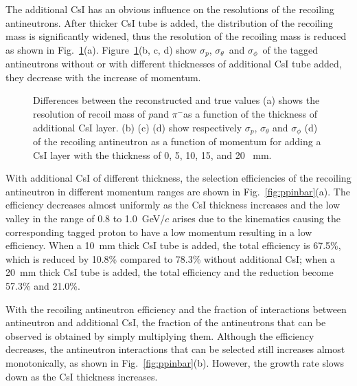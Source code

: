\documentclass[aps,preprint,showkeys,superscriptaddress]{revtex4}
\newcommand{\pp}{$p$}
\newcommand{\pim}{$\pi^-$}
\newcommand{\pres}{$\sigma_p$}
\newcommand{\tres}{$\sigma_\theta$}
\newcommand{\phires}{$\sigma_\phi$}
\begin{document}
The additional CsI has an obvious influence on the resolutions of the recoiling
antineutrons. After thicker CsI tube is added, the distribution of the
recoiling mass is significantly widened, thus the resolution of the recoiling
mass is reduced as shown in Fig.~\ref{fig:nbar_resolutions}(a).
Figure~\ref{fig:nbar_resolutions}(b, c, d) show \pres, \tres\ and \phires\ of
the tagged antineutrons without or with different thicknesses of additional CsI tube
added, they decrease with the increase of momentum.

\begin{figure}[htbp]
	\centering  %
	\subfigbottomskip=2pt %
	\subfigcapskip=-5pt %
	\caption{
Differences between the reconstructed and true values (a) shows the resolution
of recoil mass of \pp and \pim as a function of the thickness of additional CsI
layer. (b) (c) (d) show respectively \pres, $\sigma_\theta$ and $\sigma_\phi$
(d) of the recoiling antineutron as a function of momentum for adding a CsI
layer with the thickness of 0, 5, 10, 15, and 20 ~mm.
}
	\label{fig:nbar_resolutions}
\end{figure}

With additional CsI of different thickness, the selection efficiencies of the
recoiling antineutron in different momentum ranges are shown in
Fig.~\ref{fig:ppinbar}(a). The efficiency decreases almost uniformly as the CsI
thickness increases and the low valley in the range of 0.8 to 1.0~GeV/$c$ 
arises due to the kinematics causing the corresponding tagged proton to have a 
low momentum resulting in a low efficiency.
When a 10~mm thick CsI tube is added, the total efficiency is 67.5\%, which is
reduced by 10.8\% compared to 78.3\% without additional CsI; when a 20~mm thick
CsI tube is added, the total efficiency and the reduction become 57.3\% and
21.0\%.
        
With the recoiling antineutron efficiency and the fraction of interactions
between antineutron and additional CsI, the fraction of the antineutrons that
can be observed is obtained by simply multiplying them. Although the efficiency
decreases, the antineutron interactions that can be selected still increases
almost monotonically, as shown in Fig.~\ref{fig:ppinbar}(b). 
However, the growth rate slows down as the CsI thickness increases.
        
\end{document}
